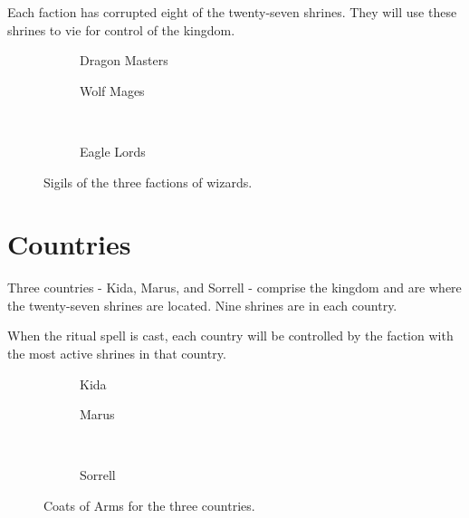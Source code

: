 \documentclass[10pt, parskip=half-, twoside]{scrartcl}
\begin{document}
Each faction has corrupted eight of the twenty-seven shrines. They will use these shrines to vie for control of the kingdom.
\vfill
\begin{figure}[hb]
\centering
\begin{subfigure}{0.4\textwidth}
\centering
{}
\caption*{Dragon Masters}
\end{subfigure}
\quad
\begin{subfigure}{0.4\textwidth}
\centering
{}
\caption*{Wolf Mages}
\end{subfigure}
\\[1em]
\begin{subfigure}{0.4\textwidth}
\centering
{}
\caption*{Eagle Lords}
\end{subfigure}
\caption*{Sigils of the three factions of wizards.}
\end{figure}


\newpage

\section*{Countries}
Three countries - Kida, Marus, and Sorrell - comprise the kingdom and are where the twenty-seven shrines are located. Nine shrines are in each country.

When the ritual spell is cast, each country will be controlled by the faction with the most active shrines in that country.
\vfill
{
\begin{figure}[hb]
\centering
\begin{subfigure}{0.35\textwidth}
\centering
{}
\caption*{Kida}
\end{subfigure}
\quad
\begin{subfigure}{0.35\textwidth}
\centering
{}
\caption*{Marus}
\end{subfigure}
\\[0.5em]
\begin{subfigure}{0.35\textwidth}
\centering
{}
\caption*{Sorrell}
\end{subfigure}
\setmainfont{Charter}
\caption*{Coats of Arms for the three countries.}
\end{figure}
}
\newpage
\end{document}
